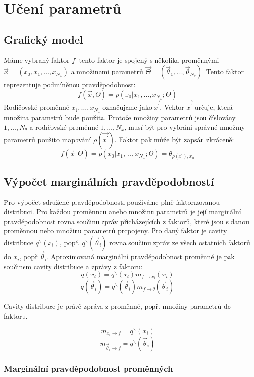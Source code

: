 \chapter{Učení parametrů}
\label{ch:ep}

\section{Grafický model}

Máme vybraný faktor $f$, tento faktor je spojený s několika proměnnými
$\vec{x} = (x_0, x_1, \dots, x_{N_x})$
a množinami parametrů
$\vec{\Theta} = (\vec{\theta}_1, \dots, \vec{\theta}_{N_\theta})$.
Tento faktor reprezentuje podmíněnou pravděpodobnost:
$$f(\vec{x}, \Theta) = p(x_0 | x_1, \dots, x_{N_x}; \Theta)$$
Rodičovské proměnné $x_1, \dots, x_{N_x}$ označujeme jako $\vec{x^\prime}$.
Vektor $\vec{x^\prime}$ určuje, která množina parametrů bude použita.
Protože množiny parametrů jsou číslovány $1, \dots, N_\theta$ a rodičovské
proměnné $1, \dots, N_x$, musí být pro vybrání správné množiny parametrů
použito mapování $\rho(\vec{x^\prime})$.
Faktor pak může být zapsán zkráceně:
$$f(\vec{x}, \Theta) = p(x_0 | x_1, \dots, x_{N_x}; \Theta) =
\theta_{\rho(x^\prime), x_0}$$

\section{Výpočet marginálních pravděpodobností}

Pro výpočet sdružené pravděpodobnosti používáme plně faktorizovanou distribuci.
Pro každou proměnnou anebo množinu parametrů je její marginální pravděpodobnost
rovna součinu zpráv přicházejících z faktorů, které jsou s danou proměnnou
nebo množinu parametrů propojeny.
Pro daný faktor je cavity distribuce $q^\backslash(x_i)$, popř.
$q^\backslash(\vec{\theta}_i)$ rovna součinu zpráv ze všech ostatních faktorů do $x_i$, popř $\vec\theta_i$.
Aproximovaná marginální pravděpodobnost proměnné je pak součinem cavity
distribuce a zprávy z faktoru:
$$q(x_i) = q^\backslash(x_i) m_{f \rightarrow x_i}(x_i)$$
$$q(\vec{\theta}_i) = q^\backslash(\vec{\theta}_i) m_{f\rightarrow \theta}(\vec{\theta}_i)$$

Cavity distribuce je právě zpráva z proměnné, popř. množiny parametrů do faktoru.

$$m_{x_i \rightarrow f} = q^\backslash (x_i)$$
$$m_{\vec\theta_i \rightarrow f} = q^\backslash (\vec\theta_i)$$

\subsection{Marginální pravděpodobnost proměnných}

